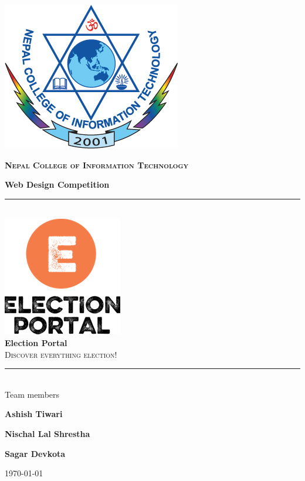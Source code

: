 \documentclass[12pt, a4paper, titlepage]{report}
\begin{document}
\begin{titlepage}
\newcommand{\HRule}{\rule{\linewidth}{0.5mm}}
\center
\begin{center}
	\includegraphics[scale=0.4]{ncit}
\end{center}
\vspace{0.75cm}
 \textsc{\Large \textbf{Nepal College of Information Technology}}\\
{\large \textbf{Web Design Competition} \par}
\vfill
\HRule \\[0.4cm]
\includegraphics[scale=0.4]{logo.png}\\[1cm] 
{ \huge \bfseries Election Portal}\\
\textsc{\large Discover everything election!}
\HRule \\[1.5cm]
\vfill
{\large Team members}\\
{\Large \textbf{Ashish Tiwari} \par}
{\Large \textbf{Nischal Lal Shrestha} \par}
{\Large \textbf{Sagar Devkota} \par}
\vfill
{\large \today}\\[1cm] 
\end{titlepage}


\begin{abstract}
The purpose of Election Portal is to digitize election and election-related activities in Nepal. Election Portal offers a web application to store candidates information, election constituency details, latest election results. The problem statement relies on understanding a way to store all the dataset in the database, solving the complexity involved within and finding an interface to provide all these dataset to the visitors without a pain. Election Portal will provide opportunity to individual volunteers to update the election datasets election result in real time. Each web page of the Election Portal will be equipped with either a search form or a filter form to enhance user's ability to get information very quickly.
\end{abstract}
\end{document}
